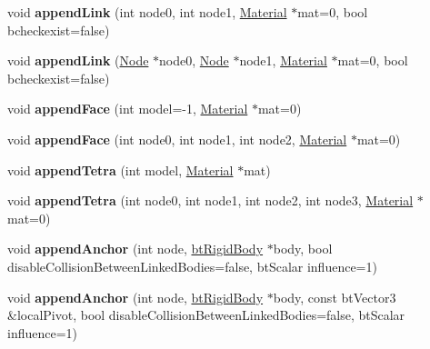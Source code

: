 \begin{DoxyCompactItemize}
\item 
\hypertarget{classbt_soft_body_a9af70d96f1962fe82baec96ef236010d}{void {\bfseries append\+Link} (int node0, int node1, \hyperlink{structbt_soft_body_1_1_material}{Material} $\ast$mat=0, bool bcheckexist=false)}\label{classbt_soft_body_a9af70d96f1962fe82baec96ef236010d}

\item 
\hypertarget{classbt_soft_body_acf014be8167a550f227ae1b366ef3337}{void {\bfseries append\+Link} (\hyperlink{structbt_soft_body_1_1_node}{Node} $\ast$node0, \hyperlink{structbt_soft_body_1_1_node}{Node} $\ast$node1, \hyperlink{structbt_soft_body_1_1_material}{Material} $\ast$mat=0, bool bcheckexist=false)}\label{classbt_soft_body_acf014be8167a550f227ae1b366ef3337}

\item 
\hypertarget{classbt_soft_body_a1a89dadf0b4a8d9553d5e2263c034b07}{void {\bfseries append\+Face} (int model=-\/1, \hyperlink{structbt_soft_body_1_1_material}{Material} $\ast$mat=0)}\label{classbt_soft_body_a1a89dadf0b4a8d9553d5e2263c034b07}

\item 
\hypertarget{classbt_soft_body_ad1fb030a3cce3125ba51533eaf6cb949}{void {\bfseries append\+Face} (int node0, int node1, int node2, \hyperlink{structbt_soft_body_1_1_material}{Material} $\ast$mat=0)}\label{classbt_soft_body_ad1fb030a3cce3125ba51533eaf6cb949}

\item 
\hypertarget{classbt_soft_body_a3d88c896f533e9ea942c746bee29711b}{void {\bfseries append\+Tetra} (int model, \hyperlink{structbt_soft_body_1_1_material}{Material} $\ast$mat)}\label{classbt_soft_body_a3d88c896f533e9ea942c746bee29711b}

\item 
\hypertarget{classbt_soft_body_a9b56ea716ed865fdfb78aa2b2ec6952a}{void {\bfseries append\+Tetra} (int node0, int node1, int node2, int node3, \hyperlink{structbt_soft_body_1_1_material}{Material} $\ast$mat=0)}\label{classbt_soft_body_a9b56ea716ed865fdfb78aa2b2ec6952a}

\item 
\hypertarget{classbt_soft_body_a8c9cc03f89f85964af6b9252ecebba09}{void {\bfseries append\+Anchor} (int node, \hyperlink{classbt_rigid_body}{bt\+Rigid\+Body} $\ast$body, bool disable\+Collision\+Between\+Linked\+Bodies=false, bt\+Scalar influence=1)}\label{classbt_soft_body_a8c9cc03f89f85964af6b9252ecebba09}

\item 
\hypertarget{classbt_soft_body_a6390973cb20d6cf26bbaca4fa0eff5a3}{void {\bfseries append\+Anchor} (int node, \hyperlink{classbt_rigid_body}{bt\+Rigid\+Body} $\ast$body, const bt\+Vector3 \&local\+Pivot, bool disable\+Collision\+Between\+Linked\+Bodies=false, bt\+Scalar influence=1)}\label{classbt_soft_body_a6390973cb20d6cf26bbaca4fa0eff5a3}


\end{DoxyCompactItemize}
